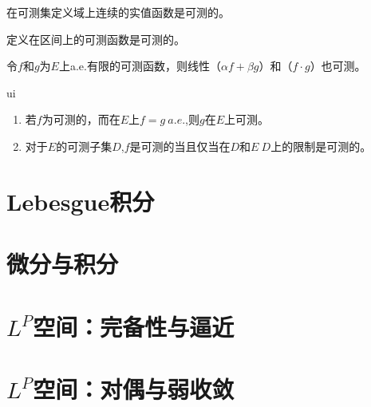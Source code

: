 \documentclass[12pt, a4paper, oneside, UTF8]{ctexbook}
\begin{document}
\begin{proposition}
	\begin{change}
		\item 在可测集定义域上连续的实值函数是可测的。
		\item 定义在区间上的可测函数是可测的。
		\item 令$f$和$g$为$E$上a.e.有限的可测函数，则线性（$\alpha f + \beta g$）和（$f\cdot g$）也可测。
		\item  ui
	\end{change}
\end{proposition}

\begin{proposition}
	\begin{enumerate}[label=\Roman*]
		 令$f$为$	E$上扩充的实值函数。
		\item  若$f$为可测的，而在$E$上$f=g \ a.e.$,则$g$在$E$上可测。
		\item 对于$E$的可测子集$D$,$f$是可测的当且仅当在$D$和$E~D$上的限制是可测的。
	\end{enumerate}
\end{proposition}



\section{Lebesgue积分}



\section{微分与积分}

\section{$L^P$空间：完备性与逼近}



\section{$L^P$空间：对偶与弱收敛}

\ifx\allfiles\undefined
\end{document}

